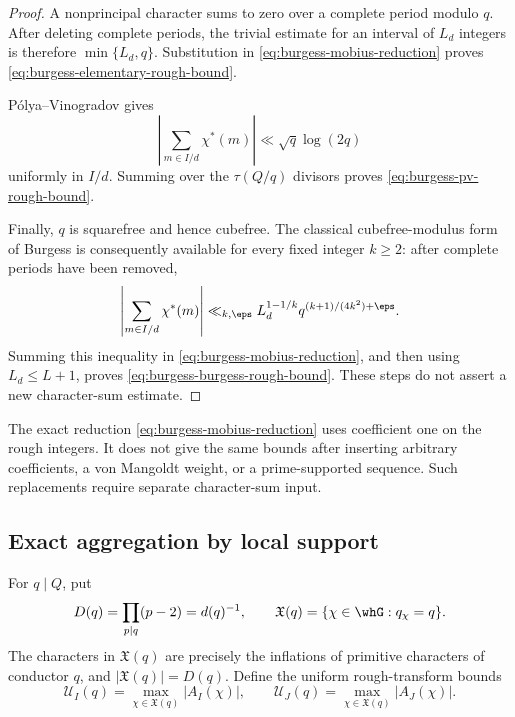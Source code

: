 \begin{proof}
A nonprincipal character sums to zero over a complete period modulo $q$.
After deleting complete periods, the trivial estimate for an interval of
$L_d$ integers is therefore $\min\{L_d,q\}$.  Substitution in
\eqref{eq:burgess-mobius-reduction} proves
\eqref{eq:burgess-elementary-rough-bound}.

P\'olya--Vinogradov gives
\[
 \left|\sum_{m\in I/d}\chi^*(m)\right|
 \ll\sqrt q\log(2q)
\]
uniformly in $I/d$.  Summing over the $\tau(Q/q)$ divisors proves
\eqref{eq:burgess-pv-rough-bound}.

Finally, $q$ is squarefree and hence cubefree.  The classical cubefree-modulus
form of Burgess is consequently available for every fixed integer $k\ge2$:
after complete periods have been removed,
\[
 \left|\sum_{m\in I/d}\chi^*(m)\right|
 \ll_{k,\eps}
 L_d^{1-1/k}q^{(k+1)/(4k^2)+\eps}.
\]
Summing this inequality in \eqref{eq:burgess-mobius-reduction}, and then using
$L_d\le L+1$, proves \eqref{eq:burgess-burgess-rough-bound}.  These steps do
not assert a new character-sum estimate.
\end{proof}

\begin{remark}
\label{rem:burgess-unweighted-only}
The exact reduction \eqref{eq:burgess-mobius-reduction} uses coefficient one
on the rough integers.  It does not give the same bounds after inserting
arbitrary coefficients, a von Mangoldt weight, or a prime-supported sequence.
Such replacements require separate character-sum input.
\end{remark}

\subsection{Exact aggregation by local support}
\label{subsec:burgess-support-aggregation}

For $q\mid Q$, put
\begin{equation}\label{eq:burgess-Dq-and-Xq}
 D(q)=\prod_{p\mid q}(p-2)=d(q)^{-1},
 \qquad
 \mathfrak X(q)=\{\chi\in\whG:q_\chi=q\}.
\end{equation}
The characters in $\mathfrak X(q)$ are precisely the inflations of primitive
characters of conductor $q$, and $|\mathfrak X(q)|=D(q)$.  Define the uniform
rough-transform bounds
\begin{equation}\label{eq:burgess-U-I-q}
 \mathcal U_I(q)=\max_{\chi\in\mathfrak X(q)}|A_I(\chi)|,
 \qquad
 \mathcal U_J(q)=\max_{\chi\in\mathfrak X(q)}|A_J(\chi)|.
\end{equation}

